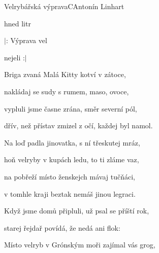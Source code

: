 \begin{song}{Velrybářská výprava}{C}{Antonín Linhart}

\begin{SBVerse}



 hned litr 


\end{SBVerse}

\begin{SBChorus}

$|$: Výprava vel

 nejeli  :$|$

\end{SBChorus}

\begin{SBVerse}

Briga zvaná Malá Kitty kotví v zátoce,

nakládaj se sudy s rumem, maso, ovoce,

vypluli jsme časne zrána, směr severní pól,

dřív, než přístav zmizel z očí, každej byl namol.

\end{SBVerse}

\begin{SBVerse}

Na loď padla jinovatka, s ní třeskutej mráz,

hoň velryby v kupách ledu, to ti zláme vaz,

na pobřeží místo ženskejch mávaj tučňáci,

v tomhle kraji beztak nemáš jinou legraci.

\end{SBVerse}

\begin{SBVerse}

Když jsme domů připluli, už psal se příští rok,

starej řejdař povídá, že nedá ani flok:

Místo velryb v Grónským moři zajímal vás grog,


\end{SBVerse}
\end{song}

